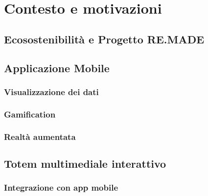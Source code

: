 \chapter{Contesto e motivazioni}

\section{Ecosostenibilità e Progetto RE.MADE}
\section{Applicazione Mobile}
\subsection{Visualizzazione dei dati}
\subsection{Gamification}
\subsection{Realtà aumentata}
\section{Totem multimediale interattivo}
\subsection{Integrazione con app mobile}